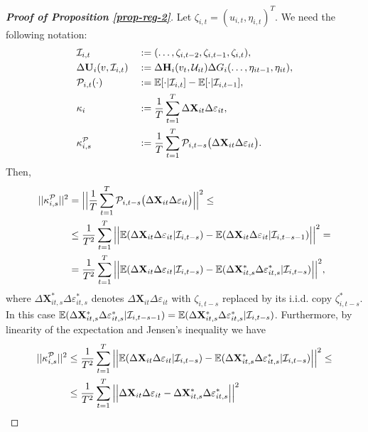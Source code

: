 \documentclass[a4paper,12pt]{article}
\begin{document}
\begin{proof}[\textnormal{\textbf{Proof of Proposition \ref{prop-reg-2}}}]
Let $\zeta_{i,t} = (u_{i, t}, \eta_{i, t})^T$. We need the following notation:
\begin{alignat*}{2}
&\mathcal{I}_{i,t} &&:= (\ldots, \zeta_{i, t-2}, \zeta_{i, t-1}, \zeta_{i,t}),\\
&\Delta \mathbf{U}_i(v, \mathcal{I}_{i, t}) &&:= \Delta \mathbf{H}_i(v_t, \mathcal{U}_{it}) \Delta G_i(\ldots, \eta_{it-1}, \eta_{it}),\\
&\mathcal{P}_{i,t}(\cdot) &&:= \mathbb{E}[\cdot|\mathcal{I}_{i, t}] -\mathbb{E}[\cdot|\mathcal{I}_{i, t-1}], \\
&\kappa_{i} && := \frac{1}{T}\sum_{t=1}^T  \Delta \mathbf{X}_{it}\Delta \varepsilon_{it}, \\
&\kappa_{i, s}^{\mathcal{P}} && := \frac{1}{T}\sum_{t=1}^T \mathcal{P}_{i, t-s}\big( \Delta \mathbf{X}_{it}\Delta \varepsilon_{it}\big).
\end{alignat*}
Then,
\begin{align*}
||\kappa_{i, s}^{\mathcal{P}}||^2 &= \Big|\Big| \frac{1}{T}\sum_{t=1}^T \mathcal{P}_{i, t-s}\big( \Delta \mathbf{X}_{it}\Delta \varepsilon_{it}\big) \Big|\Big|^2 \leq\\
&\leq \frac{1}{T^2} \sum_{t=1}^T \Big|\Big| \mathbb{E} (\Delta \mathbf{X}_{it}\Delta \varepsilon_{it}|\mathcal{I}_{i, t-s}) -\mathbb{E} (\Delta \mathbf{X}_{it}\Delta \varepsilon_{it}|\mathcal{I}_{i, t-s-1}) \Big|\Big|^2 =\\
&= \frac{1}{T^2} \sum_{t=1}^T \Big|\Big| \mathbb{E} (\Delta \mathbf{X}_{it}\Delta \varepsilon_{it}|\mathcal{I}_{i, t-s}) -\mathbb{E} (\Delta \mathbf{X}_{it, s}^*\Delta \varepsilon_{it, s}^*|\mathcal{I}_{i, t-s}) \Big|\Big|^2,
\end{align*}
where $\Delta \mathbf{X}_{it, s}^*\Delta \varepsilon_{it, s}^*$ denotes $\Delta \mathbf{X}_{it}\Delta \varepsilon_{it}$ with $\zeta_{i, t-s}$ replaced by its i.i.d. copy $\zeta_{i, t-s}^*$. In this case $\mathbb{E} (\Delta \mathbf{X}_{it, s}^*\Delta \varepsilon_{it, s}^*|\mathcal{I}_{i, t-s -1}) = \mathbb{E} (\Delta \mathbf{X}_{it, s}^*\Delta \varepsilon_{it, s}^*|\mathcal{I}_{i, t-s})$. Furthermore, by linearity of the expectation and Jensen's inequality we have 
\begin{align*}
||\kappa_{i, s}^{\mathcal{P}}||^2 &\leq \frac{1}{T^2} \sum_{t=1}^T \Big|\Big| \mathbb{E} (\Delta \mathbf{X}_{it}\Delta \varepsilon_{it}|\mathcal{I}_{i, t-s}) -\mathbb{E} (\Delta \mathbf{X}_{it, s}^*\Delta \varepsilon_{it, s}^*|\mathcal{I}_{i, t-s}) \Big|\Big|^2 \leq \\
&\leq \frac{1}{T^2} \sum_{t=1}^T \Big|\Big| \Delta \mathbf{X}_{it}\Delta \varepsilon_{it} -\Delta \mathbf{X}_{it, s}^*\Delta \varepsilon_{it, s}^*\Big|\Big|^2
\end{align*}

\end{proof}
\end{document}
